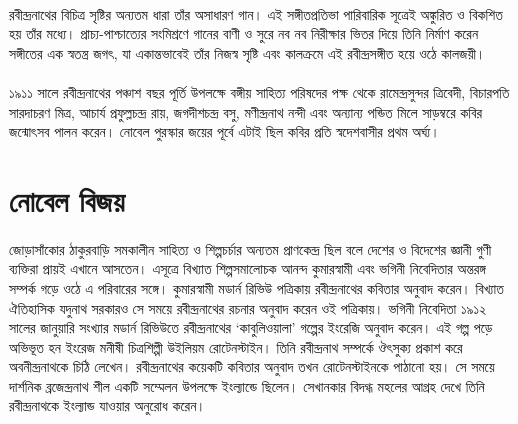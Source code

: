 \documentclass{article}
\begin{document}
\paragraph{}
রবীন্দ্রনাথের বিচিত্র সৃষ্টির অন্যতম ধারা তাঁর অসাধারণ গান। এই সঙ্গীতপ্রতিভা পারিবারিক সূত্রেই অঙ্কুরিত ও বিকশিত হয় তাঁর মধ্যে। প্রাচ্য-পাশ্চাত্যের সংমিশ্রণে গানের বাণী ও সুরে নব নব নিরীক্ষার ভিতর দিয়ে তিনি নির্মাণ করেন সঙ্গীতের এক স্বতন্ত্র জগৎ, যা একান্তভাবেই তাঁর নিজস্ব সৃষ্টি এবং কালক্রমে এই রবীন্দ্রসঙ্গীত হয়ে ওঠে কালজয়ী।
\paragraph{}
১৯১১ সালে রবীন্দ্রনাথের পঞ্চাশ বছর পূর্তি উপলক্ষে বঙ্গীয় সাহিত্য পরিষদের পক্ষ থেকে  রামেন্দ্রসুন্দর ত্রিবেদী, বিচারপতি সারদাচরণ মিত্র, আচার্য  প্রফুল্লচন্দ্র রায়, জগদীশচন্দ্র বসু, মণীন্দ্রনাথ নন্দী এবং অন্যান্য পন্ডিত মিলে সাড়ম্বরে কবির জন্মোৎসব পালন করেন। নোবেল পুরস্কার জয়ের পূর্বে এটাই ছিল কবির প্রতি স্বদেশবাসীর প্রথম অর্ঘ্য।

\section{নোবেল বিজয়}
\paragraph{}
জোড়াসাঁকোর ঠাকুরবাড়ি সমকালীন সাহিত্য ও শিল্পচর্চার অন্যতম প্রাণকেন্দ্র ছিল বলে দেশের ও বিদেশের জ্ঞানী গুণী ব্যক্তিরা প্রায়ই এখানে আসতেন। এসূত্রে বিখ্যাত শিল্পসমালোচক আনন্দ কুমারস্বামী এবং ভগিনী নিবেদিতার অন্তরঙ্গ সম্পর্ক গড়ে ওঠে এ পরিবারের সঙ্গে। কুমারস্বামী মডার্ন রিভিউ পত্রিকায় রবীন্দ্রনাথের কবিতার অনুবাদ করেন। বিখ্যাত ঐতিহাসিক যদুনাথ সরকারও সে সময়ে রবীন্দ্রনাথের রচনার অনুবাদ করেন ওই পত্রিকায়। ভগিনী  নিবেদিতা ১৯১২ সালের জানুয়ারি সংখ্যার মডার্ন রিভিউতে রবীন্দ্রনাথের ‘কাবুলিওয়ালা’ গল্পের ইংরেজি অনুবাদ করেন। এই গল্প পড়ে অভিভূত হন ইংরেজ মনীষী চিত্রশিল্পী উইলিয়ম রোটেনস্টাইন। তিনি রবীন্দ্রনাথ সম্পর্কে ঔৎসুক্য প্রকাশ করে অবনীন্দ্রনাথকে চিঠি লেখেন। রবীন্দ্রনাথের কয়েকটি কবিতার অনুবাদ তখন রোটেনস্টাইনকে পাঠানো হয়। সে সময়ে দার্শনিক  ব্রজেন্দ্রনাথ শীল একটি সম্মেলন উপলক্ষে ইংল্যান্ডে ছিলেন। সেখানকার বিদগ্ধ মহলের আগ্রহ দেখে তিনি রবীন্দ্রনাথকে ইংল্যান্ড যাওয়ার অনুরোধ করেন।
\end{document}

